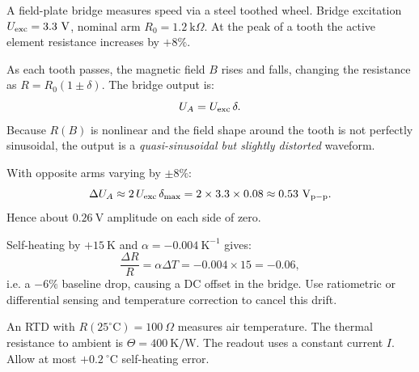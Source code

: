 

A field-plate bridge measures speed via a steel toothed wheel. Bridge excitation \(U_{\rm exc}=3.3\ \text{V}\), nominal arm \(R_0=1.2\ \text{k}\Omega\). At the peak of a tooth the active element resistance increases by \(+8\%\).



\begin{solutionblock}
As each tooth passes, the magnetic field \(B\) rises and falls, changing the resistance as \(R = R_0(1 \pm \delta)\).  
The bridge output is:
\[
U_A = U_{\rm exc}\,\delta.
\]
Because \(R(B)\) is nonlinear and the field shape around the tooth is not perfectly sinusoidal, the output is a \emph{quasi-sinusoidal but slightly distorted} waveform.
\end{solutionblock}




\begin{solutionblock}
With opposite arms varying by \(\pm8\%\):
\[
\Delta U_A \approx 2\,U_{\rm exc}\,\delta_{\max} = 2 \times 3.3 \times 0.08 \approx 0.53~\text{V}_{\rm p-p}.
\]
Hence about \(0.26~\text{V}\) amplitude on each side of zero.
\end{solutionblock}




\begin{solutionblock}
Self-heating by \(+15~\text{K}\) and \(\alpha = -0.004~\text{K}^{-1}\) gives:
\[
\frac{\Delta R}{R} = \alpha \Delta T = -0.004 \times 15 = -0.06,
\]
i.e. a \(-6\%\) baseline drop, causing a DC offset in the bridge.  
Use ratiometric or differential sensing and temperature correction to cancel this drift.
\end{solutionblock}




An RTD with $R(25^\circ \text{C}) = 100~\Omega$ measures air temperature. The thermal resistance to ambient is $\Theta = 400~\text{K/W}$. The readout uses a constant current $I$. Allow at most $+0.2~^\circ\text{C}$ self-heating error.

